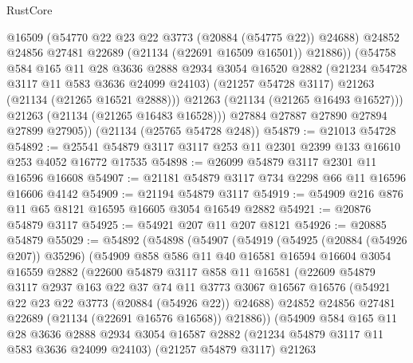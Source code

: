 \begin{lexlean}{RustCore}
\begin{coremodule}
                @16509
                (@54770 @22 @23 @22 @3773 (@20884 (@54775 @22)) @24688)
                @24852
                @24856
                @27481
                @22689
                (@21134 (@22691 @16509 @16501))
                @21886))
            (@54758
              @584
              @165
              @11
              @28
              @3636
              @2888
              @2934
              @3054
              @16520
              @2882
              (@21234 @54728 @3117 @11 @583 @3636 @24099 @24103)
              (@21257 @54728 @3117)
              @21263
              (@21134 (@21265 @16521 @2888)))
            @21263
            (@21134 (@21265 @16493 @16527)))
          @21263
          (@21134 (@21265 @16483 @16528)))
        @27884
        @27887
        @27890
        @27894
        @27899
        @27905))
    (@21134 (@25765 @54728 @248))
@54879 := @21013 @54728
@54892 := @25541 @54879 @3117 @3117 @253 @11 @2301 @2399 @133 @16610 @253 @4052 @16772 @17535
@54898 := @26099 @54879 @3117 @2301 @11 @16596 @16608
@54907 := @21181 @54879 @3117 @734 @2298 @66 @11 @16596 @16606 @4142
@54909 := @21194 @54879 @3117
@54919 := @54909 @216 @876 @11 @65 @8121 @16595 @16605 @3054 @16549 @2882
@54921 := @20876 @54879 @3117
@54925 := @54921 @207 @11 @207 @8121
@54926 := @20885 @54879
@55029 := @54892
    (@54898
      (@54907
        (@54919
          (@54925 (@20884 (@54926 @207)) @35296)
          (@54909
            @858
            @586
            @11
            @40
            @16581
            @16594
            @16604
            @3054
            @16559
            @2882
            (@22600
              @54879
              @3117
              @858
              @11
              @16581
              (@22609
                @54879
                @3117
                @2937
                @163
                @22
                @37
                @74
                @11
                @3773
                @3067
                @16567
                @16576
                (@54921 @22 @23 @22 @3773 (@20884 (@54926 @22)) @24688)
                @24852
                @24856
                @27481
                @22689
                (@21134 (@22691 @16576 @16568))
                @21886))
            (@54909
              @584
              @165
              @11
              @28
              @3636
              @2888
              @2934
              @3054
              @16587
              @2882
              (@21234 @54879 @3117 @11 @583 @3636 @24099 @24103)
              (@21257 @54879 @3117)
              @21263

\end{coremodule}
\end{lexlean}
